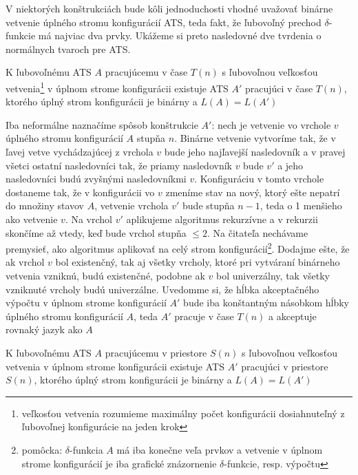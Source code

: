 \smallskip
V niektorých konštrukciách bude kôli jednoduchosti vhodné uvažovať
binárne vetvenie úplného stromu konfigurácií ATS, teda fakt, že
ľubovoľný prechod $\delta$-funkcie má najviac dva prvky. Ukážeme
si preto nasledovné dve tvrdenia o normálnych tvaroch pre ATS.

\begin{lema}\label{binarny_nt}
  K ľubovoľnému ATS $A$ pracujúcemu v čase $T(n)$ s ľubovoľnou
  veľkosťou vetvenia\footnote{veľkosťou vetvenia rozumieme maximálny
  počet konfigurácii dosiahnuteľný z ľubovoľnej konfigurácie na
  jeden krok} v úplnom strome konfigurácii existuje ATS $A'$
  pracujúci v čase $T(n)$, ktorého úplný strom konfigurácii je
  binárny a $L(A)=L(A')$
\end{lema}

\begin{dokaz}
  Iba neformálne naznačíme spôsob konštrukcie $A'$: nech je vetvenie
  vo vrchole $v$ úplného stromu konfigurácií $A$ stupňa $n$. Binárne
  vetvenie vytvoríme tak, že v ľavej vetve vychádzajúcej z vrchola
  $v$ bude jeho najľavejší nasledovník a v pravej všetci ostatní
  nasledovníci tak, že priamy nasledovník $v$ bude $v'$ a jeho
  nasledovníci budú zvyšnými nasledovníkmi $v$. Konfiguráciu v tomto
  vrchole dostaneme tak, že v konfigurácii vo $v$ zmeníme stav na
  nový, ktorý ešte nepatrí do množiny stavov $A$, vetvenie vrchola
  $v'$ bude stupňa $n-1$, teda o 1 menšieho ako vetvenie $v$. Na
  vrchol $v'$ aplikujeme algoritmus rekurzívne a v rekurzii skončíme
  až vtedy, keď bude vrchol stupňa $\leq2$. Na čitateľa nechávame
  premysieť, ako algoritmus aplikovať na celý strom
  konfigurácií\footnote{pomôcka: $\delta$-funkcia $A$ má iba konečne
  veľa prvkov a vetvenie v úplnom strome konfigurácií je iba
  grafické znázornenie $\delta$-funkcie, resp. výpočtu}. Dodajme
  ešte, že ak vrchol $v$ bol existenčný, tak aj všetky vrcholy,
  ktoré pri vytváraní binárneho vetvenia vzniknú, budú existenčné,
  podobne ak $v$ bol univerzálny, tak všetky vzniknuté vrcholy budú
  univerzálne. Uvedomme si, že hĺbka akceptačného výpočtu v úplnom
  strome konfigurácií $A'$ bude iba konštantným násobkom hĺbky
  úplného stromu konfigurácií $A$, teda $A'$ pracuje v čase $T(n)$ a
  akceptuje rovnaký jazyk ako $A$
\end{dokaz}

\begin{lema}\label{binarny_nt2}
  K ľubovoľnému ATS $A$ pracujúcemu v priestore $S(n)$ s ľubovoľnou
  veľkosťou vetvenia v úplnom strome konfigurácii existuje ATS $A'$
  pracujúci v priestore $S(n)$, ktorého úplný strom konfigurácii je
  binárny a $L(A)=L(A')$
\end{lema}

